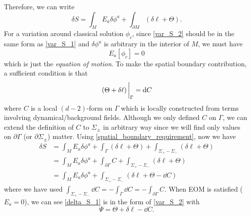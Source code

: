 \documentclass[10pt]{article}
\begin{document}
Therefore, we can write
\begin{equation}
    \delta S=\int_M E_a\delta\phi^a+\int_{\partial M}\left(\delta\ell+\Theta\right).\label{var_S_2}
\end{equation}
For a variation around classical solution $\phi_c$, since \cref{var_S_2} should be in the same form as \cref{var_S_1} and $\delta\phi^a$ is arbitrary in the interior of $M$, we must have
\begin{equation}
    E_a[\phi_c]=0
\end{equation}
which is just the \textit{equation of motion}.
To make the spatial boundary contribution, a sufficient condition is that
\begin{equation}\label{spatial_boundary_requirement}
    \eval{\left(\Theta+\delta\ell\right)}_\Gamma=\dd{C}
\end{equation}
where $C$ is a local $(d-2)$-form on $\Gamma$ which is locally constructed from terms involving dynamical/background fields.
Although we only defined $C$ on $\Gamma$, we can extend the definition of $C$ to $\Sigma_{\pm}$ in arbitrary way since we will find only values on $\partial\Gamma$ (or $\partial\Sigma_{\pm}$) matter.
Using \cref{spatial_boundary_requirement}, now we have
\begin{equation}\label{delta_S_1}
    \begin{split}
        \delta S&=\int_M E_a\delta\phi^a+\int_{\Gamma}\left(\delta\ell+\Theta\right)+\int_{\Sigma_+-\Sigma_-}\left(\delta\ell+\Theta\right)\\
        &=\int_M E_a\delta\phi^a+\int_{\partial\Gamma}C+\int_{\Sigma_+-\Sigma_-}\left(\delta\ell+\Theta\right)\\
        &=\int_M E_a\delta\phi^a+\int_{\Sigma_+-\Sigma_-}\left(\delta\ell+\Theta-\dd{C}\right)
    \end{split}
\end{equation}
where we have used $\int_{\Sigma_+ -\Sigma_-}\dd{C}=-\int_\Gamma \dd{C}=-\int_{\partial\Gamma}C$. 
When EOM is satisfied ($E_a=0$), we can see \cref{delta_S_1} is in the form of \cref{var_S_2} with
\begin{equation}
    \Psi=\Theta+\delta\ell-\dd{C}.
\end{equation}
\end{document}
